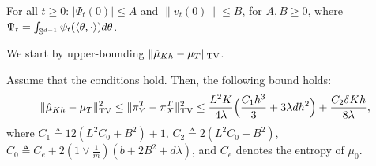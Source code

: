 %
\begin{assumption}
\label{asmp:init_fun}
For all $t \geq 0$: $|\Psi_t(0)| \leq A$ and $\|v_t(0)\| \leq B$,
for $A,B \geq 0$, where $\Psi_t = \int_{\mathbb{S}^{d-1}} \psi_{t}(\left\langle\theta,\cdot \right\rangle) d \theta$. 
\end{assumption}


 
We start by upper-bounding $\| \hat{\mu}_{Kh} - \mu_T \|_{\textnormal{TV}}$. 
%
\begin{lemma}
\label{lem:euler}
Assume that the conditions  hold. Then, the following bound holds:
\begin{align}
\| \hat{\mu}_{Kh} - \mu_{T} \|_{\textnormal{TV}}^2\leq \| \pi^T_{Y} - \pi_{X}^T \|_{\textnormal{TV}}^2 \leq \frac{L^2 K}{4\lambda} \Bigl( \frac{C_1 h^3}{3} + 3 \lambda d h^2 \Bigr) + \frac{C_2 \delta K h}{8\lambda},
\end{align}
where $C_1 \triangleq 12(L^2 C_0 + B^2)+1$, $C_2 \triangleq 2 (L^2 C_0 + B^2)$, $C_0 \triangleq C_e +2  (1 \vee \frac1{m})(b+2B^2 + d \lambda)$, and $C_e$ denotes the entropy of $\mu_0$.
\end{lemma}
%
